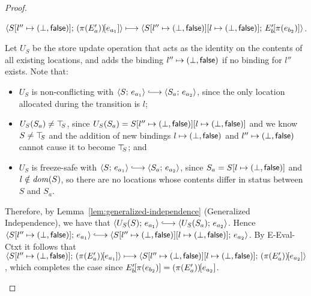 \begin{proof}
\begin{enumerate}
\begin{enumerate}
\begin{itemize}
          $\langle S[l'' \mapsto (\bot, \textsf{false})];\, (\pi(E'_a))\hspace{-1mm}\left[e_{a_1}\right] \rangle
          \longmapsto
          \langle S[l'' \mapsto (\bot, \textsf{false})][l \mapsto (\bot, \textsf{false})];\, E'_b\hspace{-1mm}\left[\pi(e_{b_2})\right] \rangle$.

          Let $U_S$ be the store update operation that acts as the
          identity on the contents of all existing locations, and adds
          the binding $l'' \mapsto (\bot, \textsf{false})$ if no
          binding for $l''$ exists.  Note that:
          \begin{itemize}
          \item $U_S$ is non-conflicting with $\config{S}{e_{a_1}}
            \parstepsto \config{S_a}{e_{a_2}}$, since the only
            location allocated during the transition is $l$;
          \item $U_S(S_a) \neq \top\hspace{-0.85mm}_{S}$, since $U_S(S_a) =
            S[l'' \mapsto (\bot, \textsf{false})][l \mapsto (\bot, \textsf{false})]$
            and we know $S \neq \top\hspace{-0.85mm}_{S}$ and the addition of new
            bindings $l \mapsto (\bot, \textsf{false})$ and
            $l'' \mapsto (\bot, \textsf{false})$ cannot cause it
            to become $\top\hspace{-0.85mm}_{S}$; and
          \item $U_S$ is freeze-safe with $\config{S}{e_{a_1}}
            \parstepsto \config{S_a}{e_{a_2}}$, since $S_a =
            S[l \mapsto (\bot, \textsf{false})]$ and $l \notin \mathit{dom}(S)$,
            so there are no locations whose contents differ in status
            between $S$ and $S_a$.
          \end{itemize}

          Therefore, by Lemma~\ref{lem:generalized-independence}
          (Generalized Independence), we have that
          $\config{U_S(S)}{e_{a_1}} \parstepsto
          \config{U_S(S_a)}{e_{a_2}}$.  Hence
          $\config{\extS{S}{l''}{\bot}{\frozenfalse}}{e_{a_1}}
          \parstepsto
          \config{\extS{\extS{S}{l''}{\bot}{\frozenfalse}}{l}{\bot}{\frozenfalse}}{e_{a_2}}$.
          By {\sc E-Eval-Ctxt} it follows that
          $\langle S[l'' \mapsto (\bot, \textsf{false})];\, (\pi(E'_a))\hspace{-1mm}\left[e_{a_1}\right] \rangle
          \longmapsto
          \langle S[l'' \mapsto (\bot, \textsf{false})][l \mapsto (\bot, \textsf{false})];\, (\pi(E'_a))\hspace{-1mm}\left[e_{a_2}\right] \rangle$,
          which completes the case since
          $E'_b\hspace{-1mm}\left[\pi(e_{b_2})\right] =
          (\pi(E'_a))\hspace{-1mm}\left[e_{a_2}\right]$.



\end{itemize}
\end{enumerate}
\end{enumerate}
\end{proof}
